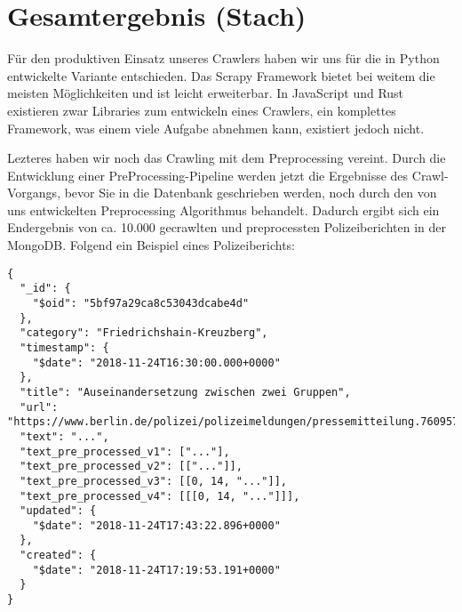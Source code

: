 \chapter{Gesamtergebnis \small{(Stach)}}

Für den produktiven Einsatz unseres Crawlers haben wir uns für die in Python entwickelte Variante entschieden.
Das Scrapy Framework bietet bei weitem die meisten Möglichkeiten und ist leicht erweiterbar.
In JavaScript und Rust existieren zwar Libraries zum entwickeln eines Crawlers, ein komplettes Framework, was einem
viele Aufgabe abnehmen kann, existiert jedoch nicht.

Lezteres haben wir noch das Crawling mit dem Preprocessing vereint. Durch die Entwicklung einer PreProcessing-Pipeline
werden jetzt die Ergebnisse des Crawl-Vorgangs, bevor Sie in die Datenbank geschrieben werden, noch durch den von uns
entwickelten Preprocessing Algorithmus behandelt. Dadurch ergibt sich ein Endergebnis von ca. 10.000 gecrawlten und preprocessten
Polizeiberichten in der MongoDB. Folgend ein Beispiel eines Polizeiberichts:


\begin{verbatim}
{
  "_id": {
    "$oid": "5bf97a29ca8c53043dcabe4d"
  },
  "category": "Friedrichshain-Kreuzberg",
  "timestamp": {
    "$date": "2018-11-24T16:30:00.000+0000"
  },
  "title": "Auseinandersetzung zwischen zwei Gruppen",
  "url": "https://www.berlin.de/polizei/polizeimeldungen/pressemitteilung.760957.php",
  "text": "...",
  "text_pre_processed_v1": ["..."],
  "text_pre_processed_v2": [["..."]],
  "text_pre_processed_v3": [[0, 14, "..."]],
  "text_pre_processed_v4": [[[0, 14, "..."]]],
  "updated": {
    "$date": "2018-11-24T17:43:22.896+0000"
  },
  "created": {
    "$date": "2018-11-24T17:19:53.191+0000"
  }
}
\end{verbatim}
